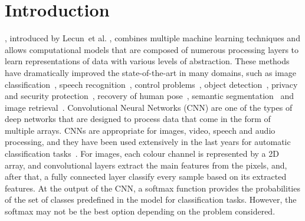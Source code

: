 \documentclass[journal]{IEEEtran}
\begin{document}
	
	
	\section{Introduction}
	\label{sect:introduction}
	, introduced by Lecun~et al. \cite{lecun2015deep}, combines multiple machine learning techniques and allows computational models that are composed of numerous processing layers to learn representations of data with various levels of abstraction. These methods have dramatically improved the state-of-the-art in many domains, such as image classification~\cite{cirecsan2012multi,he2016deep,krizhevsky2012imagenet}, speech recognition~\cite{hinton2012deep}, control problems~\cite{mnih2015human}, object detection~\cite{jiang2016speed,girshick2014rich}, privacy and security protection~\cite{yu2017iprivacy,yuan2019adversarial,tan2018deep}, recovery of human pose~\cite{hong2015multimodal}, semantic segmentation~\cite{long2015fully} and image retrieval~\cite{li2015weakly,jin2018deep}. Convolutional Neural Networks (CNN) are one of the types of deep networks that are designed to process data that come in the form of multiple arrays. CNNs are appropriate for images, video, speech and audio processing, and they have been used extensively in the last years for automatic classification tasks~\cite{dong2014learning,sun2013deep,ronneberger2015u}. For images, each colour channel is represented by a 2D array, and convolutional layers extract the main features from the pixels, and, after that, a fully connected layer classify every sample based on its extracted features. At the output of the CNN, a softmax function provides the probabilities of the set of classes predefined in the model for classification tasks. However, the softmax may not be the best option depending on the problem considered.
	
\end{document}
